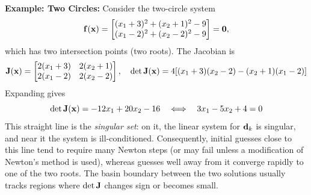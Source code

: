 \begin{exampleBox}
    \noindent\textbf{Example: Two Circles:}
    Consider the two-circle system
    \[
    \mathbf{f}(\mathbf{x})=
    \begin{bmatrix}
    (x_1+3)^2+(x_2+1)^2-9\\
    (x_1-2)^2+(x_2-2)^2-9
    \end{bmatrix}=\mathbf{0},
    \]
    which has two intersection points (two roots). The Jacobian is
    \[
    \mathbf{J}(\mathbf{x})=
    \begin{bmatrix}
    2(x_1+3) & 2(x_2+1)\\
    2(x_1-2) & 2(x_2-2)
    \end{bmatrix},
    \quad
    \det\mathbf{J}(\mathbf{x})
    =4\!\left[(x_1+3)(x_2-2)-(x_2+1)(x_1-2)\right]
    \]
    Expanding gives
    \[
    \det\mathbf{J}(\mathbf{x})=-12x_1+20x_2-16
    \quad\Longleftrightarrow\quad
    3x_1-5x_2+4=0
    \]
    This straight line is the \emph{singular set}: on it, the linear system for \(\mathbf{d}_k\) is singular, and near it the system is ill-conditioned. Consequently, initial guesses close to this line tend to require many Newton steps (or may fail unless a modification of Newton's method is used), whereas guesses well away from it converge rapidly to one of the two roots. The basin boundary between the two solutions usually tracks regions where \(\det\mathbf{J}\) changes sign or becomes small.

    \begin{center}
\end{center}
\end{exampleBox}
